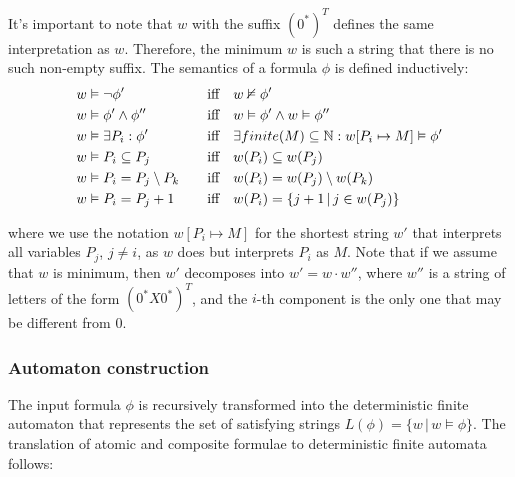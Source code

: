 \documentclass[pdflatex,sn-mathphys-num]{sn-jnl}%
\theoremstyle{thmstyleone}%
\theoremstyle{thmstyletwo}%
\theoremstyle{thmstylethree}%
\begin{document}
            \noindent It's important to note that $w$ with the suffix $(0^*)^T$ defines the same interpretation as $w$. Therefore, the minimum $w$ is such a string that there is no such non-empty suffix. The semantics of a formula $\phi$ is defined inductively:
                \begin{alignat*}{2}
                    &w \vDash \neg \phi' \quad && \textnormal{iff}\quad  w \nvDash \phi'\\
                    &w \vDash \phi' \land \phi'' \quad &&\textnormal{iff}\quad  w \vDash \phi' \land w \vDash \phi''\\
                    &w \vDash \exists P_i : \phi' \quad &&\textnormal{iff}\quad  \exists finite(M) \subseteq \mathbb{N} : w[P_i \mapsto M] \vDash \phi'\\
                    &w \vDash P_i \subseteq P_j \quad &&\textnormal{iff}\quad  w(P_i) \subseteq w(P_j)\\
                    &w \vDash P_i = P_j \setminus P_k \quad &&\textnormal{iff}\quad  w(P_i) = w(P_j) \setminus w(P_k)\\
                    &w \vDash P_i = P_j + 1 \quad &&\textnormal{iff}\quad  w(P_i) = \{j + 1\,|\, j \in w(P_j)\}
                \end{alignat*}

                where we use the notation $w[P_i \mapsto M]$ for the shortest string $w'$ that interprets all variables $P_j$, $j \neq i$, as $w$ does but interprets $P_i$ as $M$. Note that if we assume that $w$ is minimum, then $w'$ decomposes into $w' = w \cdot w''$, where $w''$ is a string of letters of the form $(0^*X0^*)^T$, and the $i$-th component is the only one that may be different from 0.

        \subsubsection*{Automaton construction}
            The input formula $\phi$ is recursively transformed into the deterministic finite automaton that represents the set of satisfying strings $L(\phi) = \{w\,|\, w \vDash \phi\}$. The translation of atomic and composite formulae to deterministic finite automata follows:


            \vspace*{0.5em}
\end{document}
